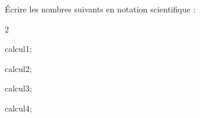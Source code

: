 \documentclass[exercice]{thedocument}%
\begin{document}
%
\begin{flushleft}
    Écrire les nombres suivants en notation scientifique :
\end{flushleft}
\begin{enumerate}
    \begin{multicols}{2}
        \item\<calcul1;
        \item\<calcul2;
        \columnbreak
        \item\<calcul3;
        \item\<calcul4;
    \end{multicols}
\end{enumerate}
\end{document}
